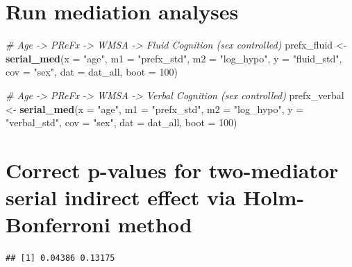 \documentclass[
]{article}
\newenvironment{Shaded}{\begin{snugshade}}{\end{snugshade}}
\newcommand{\AttributeTok}[1]{\textcolor[rgb]{0.13,0.29,0.53}{#1}}
\newcommand{\CommentTok}[1]{\textcolor[rgb]{0.56,0.35,0.01}{\textit{#1}}}
\newcommand{\DecValTok}[1]{\textcolor[rgb]{0.00,0.00,0.81}{#1}}
\newcommand{\FunctionTok}[1]{\textcolor[rgb]{0.13,0.29,0.53}{\textbf{#1}}}
\newcommand{\NormalTok}[1]{#1}
\newcommand{\OtherTok}[1]{\textcolor[rgb]{0.56,0.35,0.01}{#1}}
\newcommand{\SpecialCharTok}[1]{\textcolor[rgb]{0.81,0.36,0.00}{\textbf{#1}}}
\newcommand{\StringTok}[1]{\textcolor[rgb]{0.31,0.60,0.02}{#1}}
\begin{document}
\hypertarget{run-mediation-analyses}{%
\section{Run mediation analyses}\label{run-mediation-analyses}}

\begin{Shaded}
\begin{Highlighting}[]
\CommentTok{\# Age {-}\textgreater{} PReFx {-}\textgreater{} WMSA {-}\textgreater{} Fluid Cognition (sex controlled)}
\NormalTok{prefx\_fluid }\OtherTok{\textless{}{-}} \FunctionTok{serial\_med}\NormalTok{(}\AttributeTok{x =} \StringTok{"age"}\NormalTok{, }\AttributeTok{m1 =} \StringTok{"prefx\_std"}\NormalTok{, }\AttributeTok{m2 =}  \StringTok{"log\_hypo"}\NormalTok{, }\AttributeTok{y =} \StringTok{"fluid\_std"}\NormalTok{, }\AttributeTok{cov =} \StringTok{"sex"}\NormalTok{, }\AttributeTok{dat =}\NormalTok{ dat\_all, }\AttributeTok{boot =} \DecValTok{100}\NormalTok{)}

\CommentTok{\# Age {-}\textgreater{} PReFx {-}\textgreater{} WMSA {-}\textgreater{} Verbal Cognition (sex controlled)}
\NormalTok{prefx\_verbal }\OtherTok{\textless{}{-}} \FunctionTok{serial\_med}\NormalTok{(}\AttributeTok{x =} \StringTok{"age"}\NormalTok{, }\AttributeTok{m1 =} \StringTok{"prefx\_std"}\NormalTok{, }\AttributeTok{m2 =}  \StringTok{"log\_hypo"}\NormalTok{, }\AttributeTok{y =} \StringTok{"verbal\_std"}\NormalTok{, }\AttributeTok{cov =} \StringTok{"sex"}\NormalTok{, }\AttributeTok{dat =}\NormalTok{ dat\_all, }\AttributeTok{boot =} \DecValTok{100}\NormalTok{)}
\end{Highlighting}
\end{Shaded}

\hypertarget{correct-p-values-for-two-mediator-serial-indirect-effect-via-holm-bonferroni-method}{%
\section{Correct p-values for two-mediator serial indirect effect via
Holm-Bonferroni
method}\label{correct-p-values-for-two-mediator-serial-indirect-effect-via-holm-bonferroni-method}}

\begin{Shaded}
\end{Shaded}

\begin{verbatim}
## [1] 0.04386 0.13175
\end{verbatim}
\end{document}
